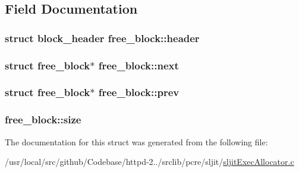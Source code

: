 \subsection{Field Documentation}
\subsubsection[{\texorpdfstring{header}{header}}]{\setlength{\rightskip}{0pt plus 5cm}struct {\bf block\+\_\+header} free\+\_\+block\+::header}\hypertarget{structfree__block_a7c325e0fbf4788e55ee69e9014c89399}{}\label{structfree__block_a7c325e0fbf4788e55ee69e9014c89399}
\subsubsection[{\texorpdfstring{next}{next}}]{\setlength{\rightskip}{0pt plus 5cm}struct {\bf free\+\_\+block}$\ast$ free\+\_\+block\+::next}\hypertarget{structfree__block_a9b209321b0d2d74936310fac046be7b5}{}\label{structfree__block_a9b209321b0d2d74936310fac046be7b5}
\subsubsection[{\texorpdfstring{prev}{prev}}]{\setlength{\rightskip}{0pt plus 5cm}struct {\bf free\+\_\+block}$\ast$ free\+\_\+block\+::prev}\hypertarget{structfree__block_a701ae4510142c228d5165e74ffd32c45}{}\label{structfree__block_a701ae4510142c228d5165e74ffd32c45}
\subsubsection[{\texorpdfstring{size}{size}}]{ free\+\_\+block\+::size}\hypertarget{structfree__block_accf7fcad60c2eb887c41897b66281db2}{}\label{structfree__block_accf7fcad60c2eb887c41897b66281db2}


The documentation for this struct was generated from the following file\+:\begin{DoxyCompactItemize}
\item 
/usr/local/src/github/\+Codebase/httpd-\/2../srclib/pcre/sljit/\hyperlink{sljitExecAllocator_8c}{sljit\+Exec\+Allocator.\+c}\end{DoxyCompactItemize}
